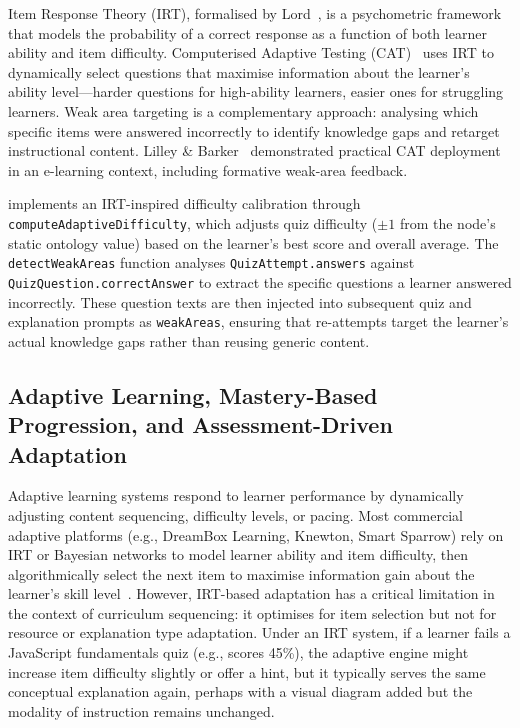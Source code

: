 Item Response Theory (IRT), formalised by Lord~\cite{lord1980}, is a psychometric framework that models the probability of a correct response as a function of both learner ability and item difficulty. Computerised Adaptive Testing (CAT)~\cite{wainer2000} uses IRT to dynamically select questions that maximise information about the learner's ability level---harder questions for high-ability learners, easier ones for struggling learners. Weak area targeting is a complementary approach: analysing which specific items were answered incorrectly to identify knowledge gaps and retarget instructional content. Lilley \& Barker~\cite{lilley2002} demonstrated practical CAT deployment in an e-learning context, including formative weak-area feedback.

\projectname{} implements an IRT-inspired difficulty calibration through \texttt{computeAdaptiveDifficulty}, which adjusts quiz difficulty (\(\pm 1\) from the node's static ontology value) based on the learner's best score and overall average. The \texttt{detectWeakAreas} function analyses \texttt{QuizAttempt.answers} against \texttt{QuizQuestion.correctAnswer} to extract the specific questions a learner answered incorrectly. These question texts are then injected into subsequent quiz and explanation prompts as \texttt{weakAreas}, ensuring that re-attempts target the learner's actual knowledge gaps rather than reusing generic content.

\subsection{Adaptive Learning, Mastery-Based Progression, and Assessment-Driven Adaptation}
\label{sec:adaptive-learning}

Adaptive learning systems respond to learner performance by dynamically adjusting content sequencing, difficulty levels, or pacing. Most commercial adaptive platforms (e.g., DreamBox Learning, Knewton, Smart Sparrow) rely on IRT or Bayesian networks to model learner ability and item difficulty, then algorithmically select the next item to maximise information gain about the learner's skill level~\cite{vanderlinden2010}. However, IRT-based adaptation has a critical limitation in the context of curriculum sequencing: it optimises for item selection but not for resource or explanation type adaptation. Under an IRT system, if a learner fails a JavaScript fundamentals quiz (e.g., scores 45\%), the adaptive engine might increase item difficulty slightly or offer a hint, but it typically serves the same conceptual explanation again, perhaps with a visual diagram added but the modality of instruction remains unchanged.

